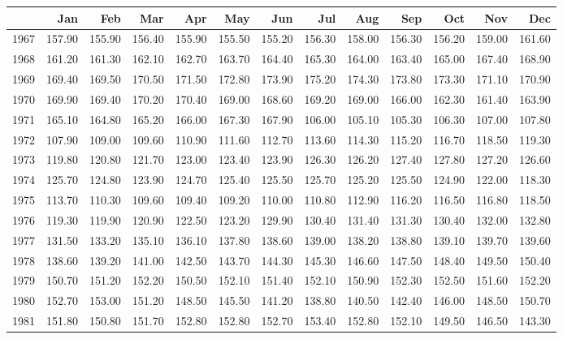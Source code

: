 \begin{longtable}{rrrrrrrrrrrrr}
  \hline
 & Jan & Feb & Mar & Apr & May & Jun & Jul & Aug & Sep & Oct & Nov & Dec \\ 
  \hline
1967 & 157.90 & 155.90 & 156.40 & 155.90 & 155.50 & 155.20 & 156.30 & 158.00 & 156.30 & 156.20 & 159.00 & 161.60 \\ 
  1968 & 161.20 & 161.30 & 162.10 & 162.70 & 163.70 & 164.40 & 165.30 & 164.00 & 163.40 & 165.00 & 167.40 & 168.90 \\ 
  1969 & 169.40 & 169.50 & 170.50 & 171.50 & 172.80 & 173.90 & 175.20 & 174.30 & 173.80 & 173.30 & 171.10 & 170.90 \\ 
  1970 & 169.90 & 169.40 & 170.20 & 170.40 & 169.00 & 168.60 & 169.20 & 169.00 & 166.00 & 162.30 & 161.40 & 163.90 \\ 
  1971 & 165.10 & 164.80 & 165.20 & 166.00 & 167.30 & 167.90 & 106.00 & 105.10 & 105.30 & 106.30 & 107.00 & 107.80 \\ 
  1972 & 107.90 & 109.00 & 109.60 & 110.90 & 111.60 & 112.70 & 113.60 & 114.30 & 115.20 & 116.70 & 118.50 & 119.30 \\ 
  1973 & 119.80 & 120.80 & 121.70 & 123.00 & 123.40 & 123.90 & 126.30 & 126.20 & 127.40 & 127.80 & 127.20 & 126.60 \\ 
  1974 & 125.70 & 124.80 & 123.90 & 124.70 & 125.40 & 125.50 & 125.70 & 125.20 & 125.50 & 124.90 & 122.00 & 118.30 \\ 
  1975 & 113.70 & 110.30 & 109.60 & 109.40 & 109.20 & 110.00 & 110.80 & 112.90 & 116.20 & 116.50 & 116.80 & 118.50 \\ 
  1976 & 119.30 & 119.90 & 120.90 & 122.50 & 123.20 & 129.90 & 130.40 & 131.40 & 131.30 & 130.40 & 132.00 & 132.80 \\ 
  1977 & 131.50 & 133.20 & 135.10 & 136.10 & 137.80 & 138.60 & 139.00 & 138.20 & 138.80 & 139.10 & 139.70 & 139.60 \\ 
  1978 & 138.60 & 139.20 & 141.00 & 142.50 & 143.70 & 144.30 & 145.30 & 146.60 & 147.50 & 148.40 & 149.50 & 150.40 \\ 
  1979 & 150.70 & 151.20 & 152.20 & 150.50 & 152.10 & 151.40 & 152.10 & 150.90 & 152.30 & 152.50 & 151.60 & 152.20 \\ 
  1980 & 152.70 & 153.00 & 151.20 & 148.50 & 145.50 & 141.20 & 138.80 & 140.50 & 142.40 & 146.00 & 148.50 & 150.70 \\ 
  1981 & 151.80 & 150.80 & 151.70 & 152.80 & 152.80 & 152.70 & 153.40 & 152.80 & 152.10 & 149.50 & 146.50 & 143.30 \\ 

\end{longtable}
